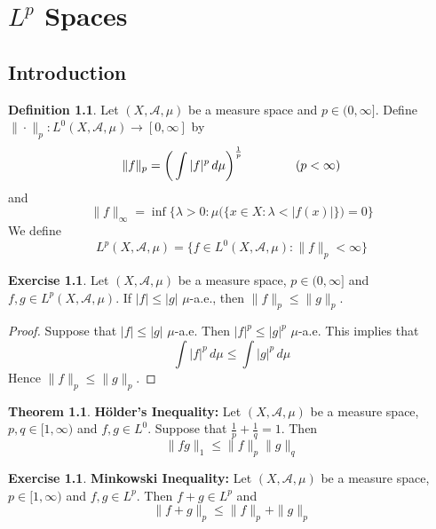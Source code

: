 \documentclass{book}
\theoremstyle{definition}
\newtheorem{defn}[definition]{Definition}
\newtheorem{thm}[definition]{Theorem}
\newtheorem{ex}[definition]{Exercise}
\newcommand{\lam}{\lambda}
\newcommand{\MA}{\mathcal{A}}
\newcommand{\lex}[1]{\label{ex:#1}}
\newcommand{\ld}[1]{\label{defn:#1}}
\DeclareMathOperator*{\0}{\mbf{0}}
\DeclareMathOperator*{\1}{\mbf{1}}
\newcommand{\dmu}{\, d \mu}
\begin{document}
	
	
	
	
	
	
	
	
	
	
	
	
	
	
	
	
	
	
	
	
	
	
	
	\newpage
	\chapter{$L^{p}$ Spaces}
	
	\section{Introduction}
	
	\begin{defn} \ld{00000} 
		Let $(X, \MA, \mu)$ be a measure space and $p \in (0, \infty]$. Define $  \| \cdot \|_p : L^0(X, \MA, \mu) \rightarrow [0, \infty]$ by $$\|f \|_p = \bigg(\int | f |^p \dmu \bigg)^{\frac{1}{p}} \hspace{1.5cm}( p < \infty)$$ 
		and 
		$$\|f \|_{\infty} = \inf \bigg \{\lam >0: \mu\big(\{x \in X: \lam < | f(x) |  \}\big) = 0 \bigg \} $$
		We define $$L^p(X, \MA, \mu) =  \{f \in L^0(X, \MA, \mu): \|f \|_p < \infty \}$$
	\end{defn}
	
	\begin{ex} \lex{00000} 
	Let $(X, \MA, \mu)$ be a measure space, $p \in (0, \infty]$ and $f,g \in L^p(X, \MA, \mu)$. If $|f| \leq |g|$ $\mu$-a.e., then $\|f\|_p \leq \|g\|_p$.
	\end{ex}
	
	\begin{proof}
	Suppose that $|f| \leq |g|$ $\mu$-a.e. Then $|f|^p \leq |g|^p$ $\mu$-a.e. This implies that $$\int |f|^p \dmu \leq  \int |g|^p \dmu$$ Hence $\|f\|_p \leq \|g\|_p$.
	\end{proof}
	
	\begin{thm}{\textbf{Hölder's Inequality:}}
		Let $(X, \MA, \mu)$ be a measure space, $p,q \in [1, \infty)$ and $f,g \in L^0$. Suppose that $\frac{1}{p} + \frac{1}{q} = 1$. Then $$\|fg\|_1 \leq \|f \|_p \|g \|_q$$
	\end{thm}
	
	\begin{ex} \lex{00000} \textbf{Minkowski Inequality:}
		Let $(X, \MA, \mu)$ be a measure space, $p \in [1, \infty)$ and $f,g \in L^p$. Then $f+g \in L^p$ and $$\|f+g\|_p  \leq \|f\|_p + \|g\|_p $$
	\end{ex}
	
\end{document}

